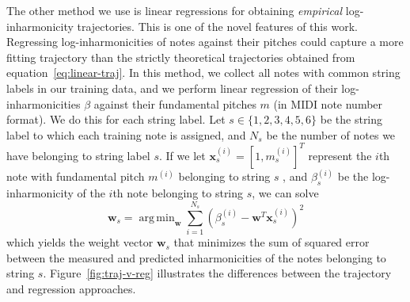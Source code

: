 \documentclass[12pt]{cmuthesis}
\DeclareMathOperator*{\argmin}{arg\,min}
\begin{document}
The other method we use is linear regressions for obtaining \textit{empirical} log-inharmonicity trajectories. This is one of the novel features of this work. Regressing log-inharmonicities of notes against their pitches could capture a more fitting trajectory than the strictly theoretical trajectories obtained from equation~\eqref{eq:linear-traj}. In this method, we collect all notes with common string labels in our training data, and we perform linear regression of their log-inharmonicities $\beta$ against their fundamental pitches $m$ (in MIDI note number format). We do this for each string label. Let $s \in \{1,2,3,4,5,6\}$ be the string label to which each training note is assigned, and $N_s$ be the number of notes we have belonging to string label $s$. If we let $\mathbf{x}_s^{(i)} = [1, m_s^{(i)}]^T$ represent the $i$th note with fundamental pitch $m^{(i)}$ belonging to string $s$ , and $\beta_s^{(i)}$ be the log-inharmonicity of the $i$th note belonging to string $s$, we can solve
\begin{equation}
\label{lin-reg}
\mathbf{w}_s = \argmin_{\mathbf{w}}{\sum_{i=1}^{N_s}{(\beta^{(i)}_s - \mathbf{w}^T\mathbf{x}^{(i)}_s)^2}}
\end{equation}
which yields the weight vector $\mathbf{w}_s$ that minimizes the sum of squared error between the measured and predicted inharmonicities of the notes belonging to string $s$. Figure~\ref{fig:traj-v-reg} illustrates the differences between the trajectory and regression approaches.
\end{document}
